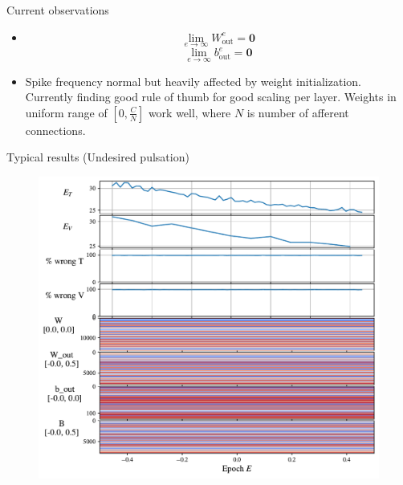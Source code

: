 \documentclass[t]{beamer}
\begin{document}
\begin{frame}{Current observations}

\begin{itemize}[label=--]
\item \[\lim_{e\to\infty} W^e_{\textrm{out}} = \mathbf{0}\]
\[\lim_{e\to\infty} b^e_{\textrm{out}} = \mathbf{0}\]
\item Spike frequency normal but heavily affected by weight initialization. Currently finding good rule of thumb for good scaling per layer. Weights in uniform range of $[0, \frac{C}{N}]$ work well, where $N$ is number of afferent connections.
\end{itemize}

\end{frame}

\begin{frame}{Typical results (Undesired pulsation)}

	\begin{figure}[!ht]
		\includegraphics[clip, trim=0cm 9.28cm 0cm 0cm, width=1\linewidth]{latest_metric.pdf}  %
	\end{figure}

\end{frame}
\end{document}
